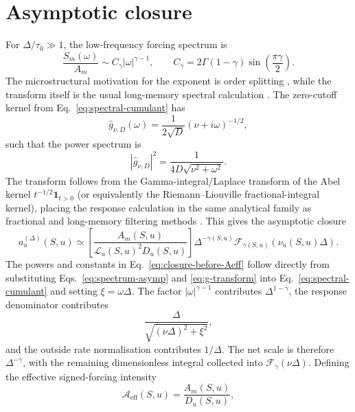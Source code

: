 \documentclass[11pt]{amsart}
\newcommand{\wh}[1]{\widehat{#1}}
\newcommand{\cL}{\mathcal{L}}
\newcommand{\Aeff}{\mathcal{A}_{\mathrm{eff}}}
\newcommand{\Fcal}{\mathcal{F}}
\theoremstyle{definition}
\theoremstyle{plain}
\theoremstyle{remark}
\begin{document}
\section{Asymptotic closure}

For $\Delta/\tau_0\gg1$, the low-frequency forcing spectrum is
\begin{equation}
 \frac{S_m(\omega)}{A_m}\sim C_\gamma |\omega|^{\gamma-1},
 \qquad
 C_\gamma=2\Gamma(1-\gamma)\sin\left(\frac{\pi\gamma}{2}\right).
 \label{eq:spectrum-asymp}
\end{equation}
The microstructural motivation for the exponent is order splitting \cite{LilloMikeFarmer2005}, while the transform itself is the usual long-memory spectral calculation \cite{Beran1994}.
The zero-cutoff kernel from Eq.~\eqref{eq:spectral-cumulant} has
\begin{equation}
 \wh g_{\nu,D}(\omega)=\frac{1}{2\sqrt{D}}(\nu+
 i\omega)^{-1/2},
 \end{equation}
such that the power spectrum is
\begin{equation}
 |\wh g_{\nu,D}|^2=\frac{1}{4D\sqrt{\nu^2+\omega^2}}.
 \label{eq:g-transform}
\end{equation}
The transform follows from the Gamma-integral/Laplace transform of the
Abel kernel $t^{-1/2}\mathbf 1_{t>0}$ (or equivalently the Riemann--Liouville fractional-integral kernel), placing the response calculation in the same analytical family as fractional and long-memory filtering methods \cite{MillerRoss1993,Beran1994,Priestley1981}.
This gives the asymptotic closure
\begin{equation}
 a_u^{(\Delta)}(S,u)
 \simeq
 \left[\frac{A_m(S,u)}{\cL_u(S,u)^2D_u(S,u)}\right]
 \Delta^{-\gamma(S,u)}
 \Fcal_{\gamma(S,u)}(\nu_u(S,u)\Delta).
 \label{eq:closure-before-Aeff}
\end{equation}
The powers and constants in Eq.~\eqref{eq:closure-before-Aeff} follow directly from substituting Eqs.~\eqref{eq:spectrum-asymp} and \eqref{eq:g-transform} into Eq.~\eqref{eq:spectral-cumulant} and setting $\xi=\omega\Delta$. The factor $|\omega|^{\gamma-1}$ contributes $\Delta^{1-\gamma}$, the response denominator contributes
\[
 \frac{\Delta}{\sqrt{(\nu\Delta)^2+\xi^2}},
\]
and the outside rate normalisation contributes $1/\Delta$. The net scale is therefore $\Delta^{-\gamma}$, with the remaining dimensionless integral collected into $\Fcal_\gamma(\nu\Delta)$.
Defining the effective signed-forcing intensity
\begin{equation}
 \Aeff(S,u)=\frac{A_m(S,u)}{D_u(S,u)},
 \label{eq:Aeff}
\end{equation}
\end{document}
